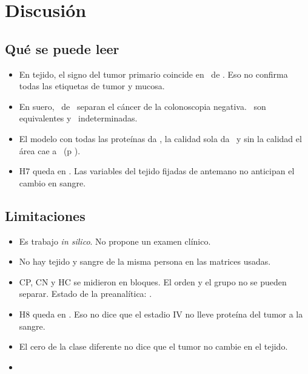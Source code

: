\chapter{Discusión}

\section{Qué se puede leer}
\begin{itemize}
\item En tejido, el signo del tumor primario coincide en \TejidoNum\ de \TejidoDen. Eso no confirma todas las etiquetas de tumor y mucosa.
\item En suero, \SueroDif\ de \SueroN\ separan el cáncer de la colonoscopia negativa. \SueroEq\ son equivalentes y \SueroInd\ indeterminadas.
\item El modelo con todas las proteínas da \MlTodas, la calidad sola da \MlCalidad\ y sin la calidad el área cae a \MlSinCalidad\ (p \MlSinCalidadP).
\item H7 queda en \HsieteEstado. Las variables del tejido fijadas de antemano no anticipan el cambio en sangre.
\end{itemize}

\section{Limitaciones}
\begin{itemize}
\item Es trabajo \textit{in silico}. No propone un examen clínico.
\item No hay tejido y sangre de la misma persona en las matrices usadas.
\item CP, CN y HC se midieron en bloques. El orden y el grupo no se pueden separar. Estado de la preanalítica: \PreEstado.
\item H8 queda en \HochoEstado. Eso no dice que el estadio IV no lleve proteína del tumor a la sangre.
\item El cero de la clase diferente no dice que el tumor no cambie en el tejido.
\item {}
\end{itemize}

